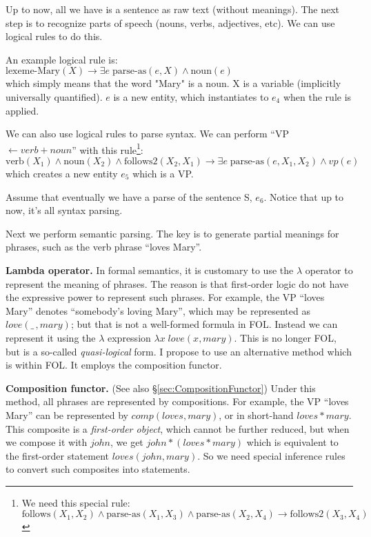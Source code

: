 Up to now, all we have is a sentence as raw text (without meanings).  The next step is to recognize parts of speech (nouns, verbs, adjectives, etc). We can use logical rules to do this.

An example logical rule is:\\
\hspace*{1cm} $\mbox{lexeme-Mary}(X) \rightarrow \exists e \; \mbox{parse-as}(e, X) \wedge \mbox{noun}(e)$\\
which simply means that the word "Mary" is a noun. X is a variable (implicitly universally quantified). $e$ is a new entity, which instantiates to $e_4$ when the rule is applied.

We can also use logical rules to parse syntax. We can perform ``VP $\leftarrow verb + noun$'' with this rule\footnote{We need this special rule:\\
\hspace*{1cm} $\mbox{follows}(X_1, X_2) \wedge \mbox{parse-as}(X_1, X_3) \wedge \mbox{parse-as}(X_2, X_4) \rightarrow \mbox{follows2}(X_3, X_4)$ }:\\
\hspace*{1cm} $\mbox{verb}(X_1) \wedge \mbox{noun}(X_2) \wedge \mbox{follows2}(X_2, X_1) \rightarrow \exists e \; \mbox{parse-as}(e, X_1, X_2) \wedge vp(e)$\\
which creates a new entity $e_5$ which is a VP.

Assume that eventually we have a parse of the sentence S, $e_6$. Notice that up to now, it's all syntax parsing.

Next we perform semantic parsing.  The key is to generate partial meanings for phrases, such as the verb phrase ``loves Mary''.

\textbf{Lambda operator.}  In formal semantics, it is customary to use the $\lambda$ operator to represent the meaning of phrases.  The reason is that first-order logic do not have the expressive power to represent such phrases.  For example, the VP ``loves Mary'' denotes ``somebody's loving Mary'', which may be represented as $love(\_ \,,mary)$; but that is not a well-formed formula in FOL.  Instead we can represent it using the $\lambda$ expression $\lambda x \; love(x,mary)$.  This is no longer FOL, but is a so-called \textit{quasi-logical} form.  I propose to use an alternative method which is within FOL.  It employs the composition functor.

\textbf{Composition functor.}  (See also \S\ref{sec:CompositionFunctor})  Under this method, all phrases are represented by compositions.  For example, the VP ``loves Mary'' can be represented by $comp(loves,mary)$, or in short-hand $loves * mary$.  This composite is a \textit{first-order object}, which cannot be further reduced, but when we compose it with $john$, we get $john * (loves * mary)$ which is equivalent to the first-order statement $loves(john,mary)$.  So we need special inference rules to convert such composites into statements.

